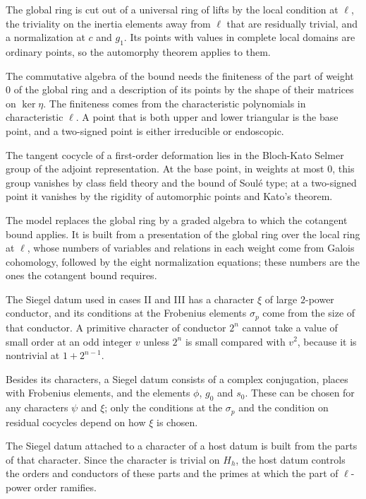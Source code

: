 The global ring is cut out of a universal ring of lifts by the local condition at $\ell$, the triviality on the inertia elements away from $\ell$ that are residually trivial, and a normalization at $c$ and $g_1$. Its points with values in complete local domains are ordinary points, so the automorphy theorem applies to them.

The commutative algebra of the bound needs the finiteness of the part of weight $0$ of the global ring and a description of its points by the shape of their matrices on $\ker\eta$. The finiteness comes from the characteristic polynomials in characteristic $\ell$. A point that is both upper and lower triangular is the base point, and a two-signed point is either irreducible or endoscopic.

The tangent cocycle of a first-order deformation lies in the Bloch-Kato Selmer group of the adjoint representation. At the base point, in weights at most $0$, this group vanishes by class field theory and the bound of Soulé type; at a two-signed point it vanishes by the rigidity of automorphic points and Kato's theorem.

The model replaces the global ring by a graded algebra to which the cotangent bound applies. It is built from a presentation of the global ring over the local ring at $\ell$, whose numbers of variables and relations in each weight come from Galois cohomology, followed by the eight normalization equations; these numbers are the ones the cotangent bound requires.

The Siegel datum used in cases II and III has a character $\xi$ of large $2$-power conductor, and its conditions at the Frobenius elements $\sigma_p$ come from the size of that conductor. A primitive character of conductor $2^n$ cannot take a value of small order at an odd integer $v$ unless $2^n$ is small compared with $v^2$, because it is nontrivial at $1+2^{n-1}$.

Besides its characters, a Siegel datum consists of a complex conjugation, places with Frobenius elements, and the elements $\phi$, $g_0$ and $s_0$. These can be chosen for any characters $\psi$ and $\xi$; only the conditions at the $\sigma_p$ and the condition on residual cocycles depend on how $\xi$ is chosen.

The Siegel datum attached to a character of a host datum is built from the parts of that character. Since the character is trivial on $H_h$, the host datum controls the orders and conductors of these parts and the primes at which the part of $\ell$-power order ramifies.

